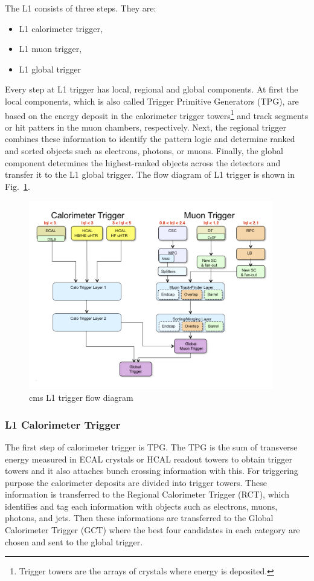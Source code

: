 The L1 consists of three steps. They are:
\begin{itemize}
	\item L1 calorimeter trigger,
	\item L1 muon trigger,
	\item L1 global trigger
\end{itemize}
Every step at L1 trigger has local, regional and global components. At first the local components, which is also called Trigger Primitive Generators (TPG), are based on the energy deposit in the calorimeter trigger towers\footnote{Trigger towers are the arrays of crystals where energy is deposited.} and track segments or hit patters in the muon chambers, respectively. Next, the regional trigger combines these information to identify the pattern logic and determine ranked and sorted objects such as electrons, photons, or muons. Finally, the global component determines the highest-ranked objects across the detectors and transfer it to the L1 global trigger. The flow diagram of L1 trigger is shown in Fig.~\ref{fig:cms-L1-trigger}.
\begin{figure}[htbp]
	\centering
	\includegraphics[width=0.95\textwidth]{figures/LHC/TriggerBlockDiagram_Eta.jpg}
	\caption{cms L1 trigger flow diagram~\cite{L1trigger-2013}}
	\label{fig:cms-L1-trigger}
\end{figure}


\subsubsection{L1 Calorimeter Trigger} %
\label{ssub:l1_calorimeter_trigger}
The first step of calorimeter trigger is TPG. The TPG is the sum of transverse energy measured in ECAL crystals or HCAL readout towers to obtain trigger towers and it also attaches bunch crossing information with this. For triggering purpose the calorimeter deposits are divided into trigger towers. These information is transferred to the Regional Calorimeter Trigger (RCT), which identifies and tag each information with objects such as electrons, muons, photons, and jets. Then these informations are transferred to the Global Calorimeter Trigger (GCT) where the best four candidates in each category are chosen and sent to the global trigger.

